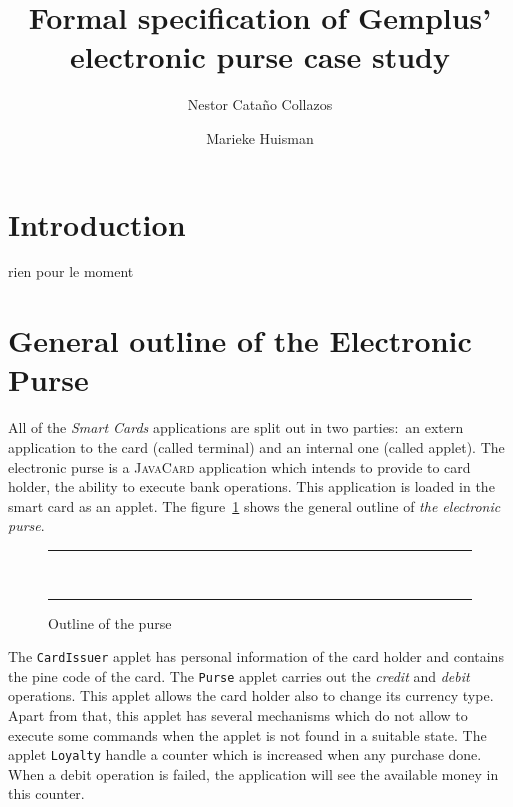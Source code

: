 \documentclass[a4paper]{llncs}
\title{Formal specification of Gemplus' electronic purse case study}
\author{
  Nestor Cata\~no Collazos
\and
  Marieke Huisman
}
\institute{
  INRIA Sophia-Antipolis, France \\ 
  \email{Nestor.Catano@sophia.inria.fr,
         Marieke.Huisman@sophia.inria.fr}
}
\begin{document}


\maketitle


\begin{abstract}

\end{abstract}

\section{Introduction}
\label{SectIntro}
rien pour le moment





\section{General outline of the Electronic Purse}
\label{SectGenPurse}
All of the \textit{Smart Cards} applications are split out in two
parties$:$ an extern application to the card (called terminal) and an
internal one (called applet). The electronic purse is a
\textsc{JavaCard} application which intends to provide to card holder,
the ability to execute bank operations. This application is loaded in
the smart card as an applet. The figure~\ref{fig-cas-pur} shows the
general outline of \textit{the electronic purse}.




\begin{center}
\begin{figure}[hbt]
\rule{\linewidth}{0.3mm}
\\[2.5ex]
\centering
{}
\caption{Outline of the purse}
\label{fig-cas-pur}
\rule{\linewidth}{0.3mm}
\end{figure}
\end{center}




The  \texttt{CardIssuer} applet has personal information of the card
holder and contains the pine code of the card. The \texttt{Purse}
applet carries out the \textit{credit} and \textit{debit}
operations. This applet allows the card holder also to change its
currency type. Apart from that, this applet has several mechanisms
which do not allow to execute some commands when the applet is not
found in a suitable state. The applet \texttt{Loyalty} handle a
counter which is increased when any purchase done. When
a debit operation is failed, the application will see the available
money in this counter.
\end{document}
